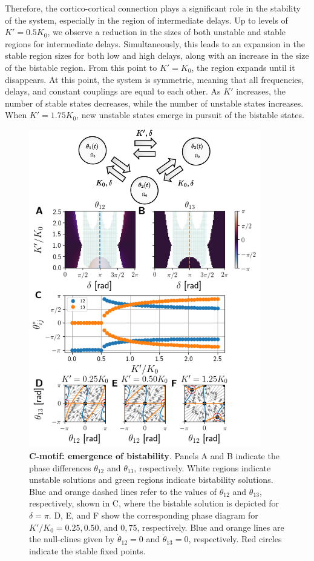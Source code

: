 \documentclass[../main.tex]{subfiles}
\begin{document}
Therefore, the cortico-cortical connection plays a significant role in the stability of the system, especially in the region of intermediate delays.
Up to levels of $K'=0.5K_0$, we observe a reduction in the sizes of both unstable and stable regions for intermediate delays. Simultaneously, this leads to an expansion in the stable region sizes for both low and high delays, along with an increase in the size of the bistable region.
From this point to $K'=K_0$, the region expands until it disappears.
At this point, the system is symmetric, meaning that all frequencies, delays, and constant couplings are equal to each other.
As $K'$ increases, the number of stable states decreases, while the number of unstable states increases. When $K'=1.75K_0$, new unstable states emerge in pursuit of the bistable states.
\begin{figure}[htpb]
    \centering
    \includegraphics[width=0.9\textwidth]{chapter2/figures/cmotif_different_coupling_edited.png}
    \caption{\textbf{C-motif: emergence of bistability}. 
    Panels A and B indicate the phase differences $\theta_{12}$ and $\theta_{13}$, respectively.
    White regions indicate unstable solutions and green regions indicate bistability solutions.
    Blue and orange dashed lines refer to the values of $\theta_{12}$ and $\theta_{13}$, respectively, shown in C, where the bistable solution is depicted for $\delta = \pi$.
    D, E, and F show the corresponding phase diagram for $K'/K_0 = 0.25, 0.50$, and $0,75$, respectively.
    Blue and orange lines are the null-clines given by $\dot{\theta}_{12} = 0$ and $\dot{\theta}_{13}=0$, respectively.
    Red circles indicate the stable fixed points.}
    \label{fig:cmotif_bistability}
\end{figure}
\end{document}
